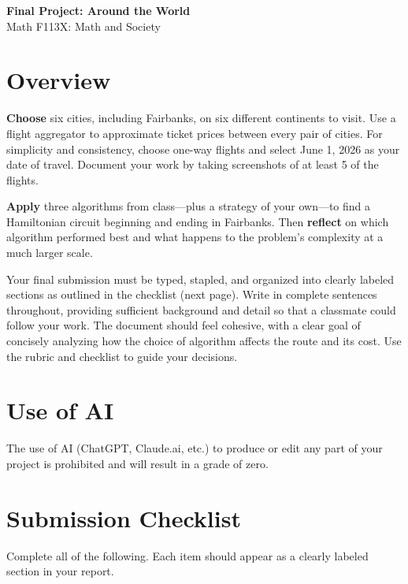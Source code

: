 \documentclass[11pt]{article}
\title{}
\author{}
\date{}
\begin{document}
\begin{center}{\Large\textbf{Final Project: Around the World}}\\ 

Math F113X: Math and Society \end{center}

\section*{\normalsize Overview}

\textbf{Choose} six cities, including Fairbanks, on six different continents to visit. Use a flight aggregator to approximate ticket prices between every pair of cities. For simplicity and consistency, choose one-way flights and select June 1, 2026 as your date of travel. Document your work by taking screenshots of at least 5 of the flights. 

\textbf{Apply} three algorithms from class---plus a strategy of your own---to find a Hamiltonian circuit beginning and ending in Fairbanks. Then \textbf{reflect} on which algorithm performed best and what happens to the problem's complexity at a much larger scale.

Your final submission must be typed, stapled, and organized into clearly labeled sections as outlined in the checklist (next page). Write in complete sentences throughout, providing sufficient background and detail so that a classmate could follow your work. The document should feel cohesive, with a clear goal of concisely analyzing how the choice of algorithm affects the route and its cost. Use the rubric and checklist to guide your decisions.

\section*{\normalsize Use of AI}
The use of AI (ChatGPT, Claude.ai, etc.) to produce or edit any part of your project is prohibited and will result in a grade of zero.

\section*{\normalsize Submission Checklist}

\noindent Complete all of the following. Each item should appear as a clearly labeled section in your report.
\end{document}
